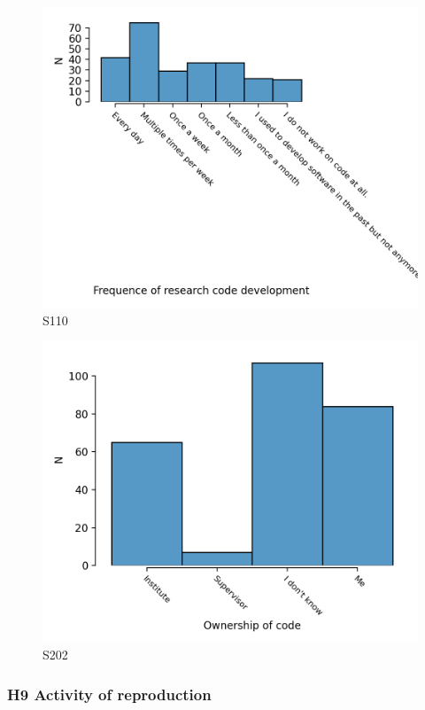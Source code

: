 \documentclass{article}
\begin{document}
\begin{figure}[!p]
    \centering
    \includegraphics[width=\textwidth]{../figs/S110.png}
	\caption{S110 }
    \label{fig:S110}
\end{figure}

\begin{figure}[!p]
    \centering
    \includegraphics[width=\textwidth]{../figs/S202.png}
	\caption{S202 }
    \label{fig:S202}
\end{figure}

\subsubsection{H9 Activity of reproduction}
\end{document}
